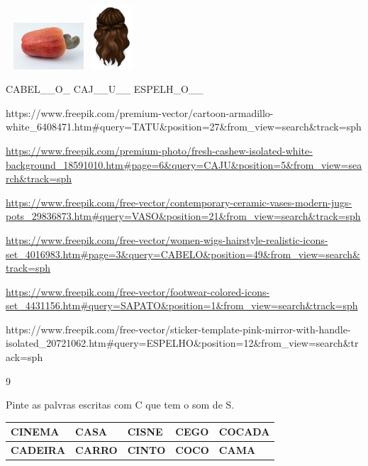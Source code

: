 {\includegraphics[width=1.26250in,height=0.68750in]{media/image38.jpeg}\includegraphics[width=0.59873in,height=0.93296in]{media/image39.jpeg}

CABEL\_\_O\_ CAJ\_\_U\_\_ ESPELH\_O\_\_

https://www.freepik.com/premium-vector/cartoon-armadillo-white\_6408471.htm\#query=TATU\&position=27\&from\_view=search\&track=sph

\url{https://www.freepik.com/premium-photo/fresh-cashew-isolated-white-background_18591010.htm\#page=6\&query=CAJU\&position=5\&from_view=search\&track=sph}

\url{https://www.freepik.com/free-vector/contemporary-ceramic-vases-modern-jugs-pots_29836873.htm\#query=VASO\&position=21\&from_view=search\&track=sph}

\url{https://www.freepik.com/free-vector/women-wigs-hairstyle-realistic-icons-set_4016983.htm\#page=3\&query=CABELO\&position=49\&from_view=search\&track=sph}

\url{https://www.freepik.com/free-vector/footwear-colored-icons-set_4431156.htm\#query=SAPATO\&position=1\&from_view=search\&track=sph}

https://www.freepik.com/free-vector/sticker-template-pink-mirror-with-handle-isolated\_20721062.htm\#query=ESPELHO\&position=12\&from\_view=search\&track=sph

\num{9}

Pinte as palvras escritas com C que tem o som de S.


\begin{longtable}[]{@{}lllll@{}}
\toprule
\textbf{CINEMA} & \textbf{CASA} & \textbf{CISNE} & \textbf{CEGO} &
\textbf{COCADA}\tabularnewline
\midrule
\endhead
\textbf{CADEIRA} & \textbf{CARRO} & \textbf{CINTO } & \textbf{COCO} &
\textbf{CAMA}\tabularnewline
\bottomrule
\end{longtable}

}
